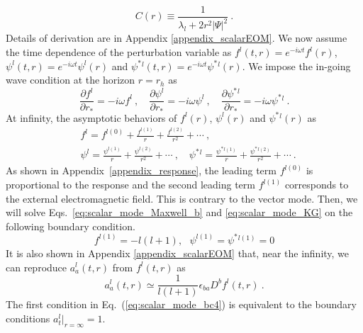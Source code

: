 \documentclass[a4paper,11pt]{article}
\begin{document}
    \begin{equation}
        \label{eq:scalar_mode_C(r)}
        C(r)\equiv \frac{1}{\lambda_l+2 r^2 |\Psi|^2}\ .
    \end{equation}
    Details of derivation are in Appendix \ref{appendix_scalarEOM}. We now assume the time dependence of the perturbation variable as $f^l(t,r)=e^{-i\omega t}f^l(r)$, 
    $\psi^l(t,r)=e^{-i\omega t}\psi^l(r)$ and  $\psi^{\ast}{}^l(t,r)=e^{-i\omega t}\psi^\ast{}^l(r)$.
    We impose the in-going wave condition at the horizon $r=r_h$ as
    \begin{equation}
        \frac{\partial f^l}{\partial r_*}=-i \omega  f^l\ ,\quad 
        \frac{\partial \psi^l}{\partial r_*}=-i \omega  \psi^l\ ,\quad 
        \frac{\partial \psi^\ast{}^l}{\partial r_*}=-i \omega  \psi^\ast{}^l\ .
    \end{equation}
    At infinity, the asymptotic behaviors of $f^l(r)$, $\psi^l(r)$  and $\psi^\ast{}^l(r)$ as
    \begin{equation}
        \begin{split}
        &f^l=f^{l(0)}+\frac{f^{l(1)}}{r}+\frac{f^{l(2)}}{r^2}+\cdots\ ,\\
        &\psi^l=\frac{\psi^{l(1)}}{r}+\frac{\psi^{l(2)}}{r^2}+\cdots\ ,\quad 
        \psi^\ast{}^l=\frac{\psi^\ast{}^{l(1)}}{r}+\frac{\psi^\ast{}^{l(2)}}{r^2}+\cdots\ .
        \end{split}
        \label{eq:scalar_mode_asmp}
    \end{equation}
    As shown in Appendix~\ref{appendix_response}, the leading term $f^{l(0)}$ is proportional to the response and the second leading term $f^{l(1)}$ corresponds to the external electromagnetic field. 
    This is contrary to the vector mode.
    Then, we will solve Eqs.~\eqref{eq:scalar_mode_Maxwell_b} and \eqref{eq:scalar_mode_KG} on the following boundary condition.
    \begin{equation}
        \label{eq:scalar_mode_bc4}
        f^{l(1)}=-l(l+1),\ \ \ 
        \psi^{l(1)}=\psi^\ast{}^{l(1)}=0
    \end{equation}
    It is also shown in Appendix \ref{appendix_scalarEOM} that, near the infinity,  we can reproduce $a^l_a(t,r)$ from $f^l(t,r)$ as 
    \begin{equation}
        \label{eq:scalar_mode_a(f)}
        a^l_a(t,r)\simeq \frac{1}{l(l+1)}\epsilon_{ba}D^b f^l(t,r)\ .
    \end{equation}
    The first condition in Eq.~(\ref{eq:scalar_mode_bc4}) is equivalent to the boundary conditions $a^l_t|_{r=\infty} = 1$. 
\end{document}
